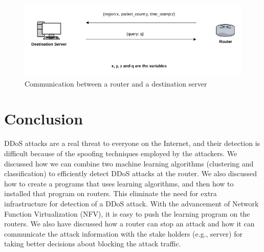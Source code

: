 \documentclass[12pt,oneside,a4paper]{article}
\begin{document}
\begin{figure}[H]
\centering
\includegraphics[scale=0.5]{router-network-communication.png}
\caption{Communication between a router and a destination server} \label{fig:router-network-communication}
\end{figure}

\pagebreak
\section{Conclusion}

DDoS attacks are a real threat to everyone on the Internet, and their detection is difficult because of the spoofing techniques employed by the attackers. We discussed how we can combine two machine learning algorithms (clustering and classification) to efficiently detect DDoS attacks at the router. We also discussed how to create a programs that uses learning algorithms, and then how to installed that program on routers. This eliminate the need for extra infrastructure for detection of a DDoS attack. With the advancement of Network Function Virtualization (NFV), it is easy to push the learning program on the routers. We also have discussed how a router can stop an attack and how it can communicate the attack information with the stake holders (e.g., server) for taking better decisions about blocking the attack traffic.
\pagebreak

\singlespacing
\end{document}
